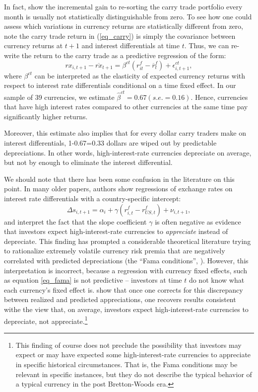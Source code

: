 \documentclass{ar-1col}
\begin{document}
In fact, \citet{HassanMano2019} show the incremental gain to re-sorting the carry trade portfolio every month is usually not statistically distinguishable from zero. To see how one could assess which variations in currency returns are statistically different from zero, note the carry trade return in (\ref{eq_carry}) is simply the covariance between currency returns at $t+1$ and interest differentials at time $t$. Thus, we can re-write the return to the carry trade as a predictive regression of the form:
\begin{equation}
    rx_{i,t+1} - \overline{rx}_{t+1} 
    = \beta^{ct}\left( r^f_{it}-\overline{r}^f_{t}\right) +\epsilon_{i,t+1}^{ct},  \label{eq_ct}
\end{equation} 
where $\beta ^{ct}$ can be interpreted as the elasticity of expected currency returns with respect to interest rate differentials conditional on a time fixed effect. In our sample of 39 currencies, we estimate $\hat{\beta}^{ct}=0.67 (s.e.=0.16)$. Hence, currencies that have high interest rates compared to other currencies at the same time pay significantly higher returns.

Moreover, this estimate also implies that for every dollar carry traders make on interest differentials, 1-0.67=0.33 dollars are wiped out by predictable depreciations. In other words, high-interest-rate currencies depreciate on average, but not by enough to eliminate the interest differential.

We should note that there has been some confusion in the literature on this point. In many older papers, authors show regressions of exchange rates on interest rate differentials with a country-specific intercept:
\begin{equation}
    \Delta s_{i,t+1} 
    = \alpha_i + \gamma \left(r^f_{i, t} - r^f_{US, t}\right) + \nu_{i, t+1},
\label{eq_fama} 
\end{equation}
and interpret the fact that the slope coefficient $\gamma$ is often negative as evidence that investors expect high-interest-rate currencies to \textit{appreciate} instead of depreciate. This finding has prompted a considerable theoretical literature trying to rationalize extremely volatile currency risk premia that are negatively correlated with predicted depreciations (the ``Fama conditions'', \citet{Backusetal2001}). However, this interpretation is incorrect, because a regression with currency fixed effects, such as equation \eqref{eq_fama} is not predictive -- investors at time $t$ do not know what each currency's fixed effect is. \citet{HassanMano2019} show that once one corrects for this discrepancy between realized and predicted appreciations, one recovers results consistent withe the view that, on average, investors expect high-interest-rate currencies to depreciate, not appreciate.\footnote{This finding of course does not preclude the possibility that investors may expect or may have expected some high-interest-rate currencies to appreciate in specific historical circumstances. That is, the Fama conditions may be relevant in specific instances, but they do not describe the typical behavior of a typical currency in the post Bretton-Woods era.}
\end{document}
